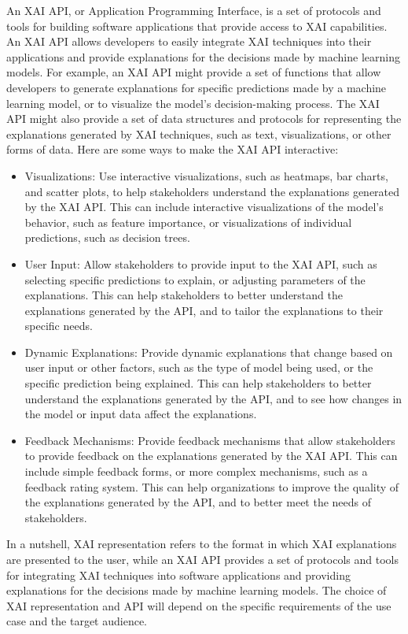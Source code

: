 \documentclass[conference]{IEEEtran}
\begin{document}
An XAI API, or Application Programming Interface, is a set of protocols and tools for building software applications that provide access to XAI capabilities. An XAI API allows developers to easily integrate XAI techniques into their applications and provide explanations for the decisions made by machine learning models. For example, an XAI API might provide a set of functions that allow developers to generate explanations for specific predictions made by a machine learning model, or to visualize the model's decision-making process. The XAI API might also provide a set of data structures and protocols for representing the explanations generated by XAI techniques, such as text, visualizations, or other forms of data. Here are some ways to make the XAI API interactive:
\begin{itemize}
	\item Visualizations: Use interactive visualizations, such as heatmaps, bar charts, and scatter plots, to help stakeholders understand the explanations generated by the XAI API. This can include interactive visualizations of the model's behavior, such as feature importance, or visualizations of individual predictions, such as decision trees.
	\item User Input: Allow stakeholders to provide input to the XAI API, such as selecting specific predictions to explain, or adjusting parameters of the explanations. This can help stakeholders to better understand the explanations generated by the API, and to tailor the explanations to their specific needs.
	\item Dynamic Explanations: Provide dynamic explanations that change based on user input or other factors, such as the type of model being used, or the specific prediction being explained. This can help stakeholders to better understand the explanations generated by the API, and to see how changes in the model or input data affect the explanations.
	\item Feedback Mechanisms: Provide feedback mechanisms that allow stakeholders to provide feedback on the explanations generated by the XAI API. This can include simple feedback forms, or more complex mechanisms, such as a feedback rating system. This can help organizations to improve the quality of the explanations generated by the API, and to better meet the needs of stakeholders.
\end{itemize}

In a nutshell, XAI representation refers to the format in which XAI explanations are presented to the user, while an XAI API provides a set of protocols and tools for integrating XAI techniques into software applications and providing explanations for the decisions made by machine learning models. The choice of XAI representation and API will depend on the specific requirements of the use case and the target audience.
\end{document}
